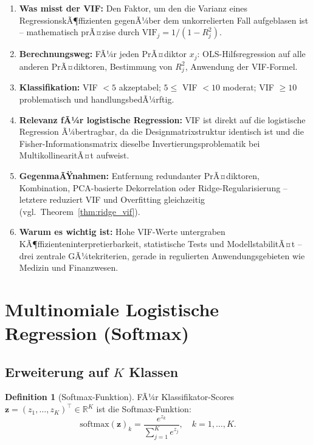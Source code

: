 ﻿\documentclass[12pt, a4paper]{article}
\theoremstyle{definition}
\newtheorem{definition}[theorem]{Definition}
\theoremstyle{remark}
\newcommand{\R}{\mathbb{R}}
\newcommand{\vz}{\bm{z}}
\newcommand{\T}{\top}
\begin{document}
\begin{tcolorbox}[notebox, title={Kernaussagen: VIF und MultikollinearitÃ¤t}]
	\begin{enumerate}[label=\textbf{\arabic*.}]
		\item \textbf{Was misst der VIF:} Den Faktor, um den die Varianz eines RegressionskÃ¶ffizienten
		gegenÃ¼ber dem unkorrelierten Fall aufgeblasen ist -- mathematisch prÃ¤zise durch 
		$\mathrm{VIF}_j = 1/(1-R_j^2)$.
		\item \textbf{Berechnungsweg:} FÃ¼r jeden PrÃ¤diktor $x_j$: OLS-Hilfsregression auf alle
		anderen PrÃ¤diktoren, Bestimmung von $R_j^2$, Anwendung der VIF-Formel.
		\item \textbf{Klassifikation:} VIF $< 5$ akzeptabel; $5 \leq$ VIF $< 10$ moderat;
		VIF $\geq 10$ problematisch und handlungsbedÃ¼rftig.
		\item \textbf{Relevanz fÃ¼r logistische Regression:} VIF ist direkt auf die logistische
		Regression Ã¼bertragbar, da die Designmatrixstruktur identisch ist und die
		Fisher-Informationsmatrix dieselbe Invertierungsproblematik bei MultikollinearitÃ¤t aufweist.
		\item \textbf{GegenmaÃŸnahmen:} Entfernung redundanter PrÃ¤diktoren, Kombination,
		PCA-basierte Dekorrelation oder Ridge-Regularisierung -- letztere reduziert VIF und
		Overfitting gleichzeitig (vgl.~Theorem~\ref{thm:ridge_vif}).
		\item \textbf{Warum es wichtig ist:} Hohe VIF-Werte untergraben KÃ¶ffizienteninterpretierbarkeit,
		statistische Tests und ModellstabilitÃ¤t -- drei zentrale GÃ¼tekriterien, gerade in
		regulierten Anwendungsgebieten wie Medizin und Finanzwesen.
	\end{enumerate}
\end{tcolorbox}

\section{Multinomiale Logistische Regression (Softmax)}

\subsection{Erweiterung auf $K$ Klassen}

\begin{definition}[Softmax-Funktion]
  FÃ¼r Klassifikator-Scores $\vz = (z_1,\ldots,z_K)^\T \in \R^K$ ist die Softmax-Funktion:
  \begin{equation}
    \mathrm{softmax}(\vz)_k = \frac{e^{z_k}}{\sum_{j=1}^K e^{z_j}}, \quad k = 1, \ldots, K.
    \label{eq:softmax}
  \end{equation}
\end{definition}
\end{document}
